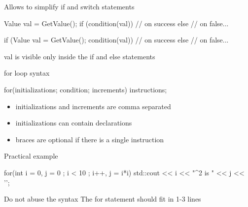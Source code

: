 \begin{frame}[fragile]
  Allows to simplify if and switch statements
  \begin{alertblock}{}
    \begin{cppcode*}{}
      Value val = GetValue();
      if (condition(val)) {
        // on success
      } else {
        // on false...
      }
    \end{cppcode*}
  \end{alertblock}
  \begin{exampleblock}{}
    \begin{cppcode*}{}
      if (Value val = GetValue(); condition(val)) {
        // on success
      } else {
        // on false...
      }
    \end{cppcode*}
    \vspace{-.1cm}
    val is visible only inside the if and else statements
  \end{exampleblock}
\end{frame}

\begin{frame}[fragile]
  \begin{block}{for loop syntax}
    \begin{cppcode*}{}
      for(initializations; condition; increments) {
        instructions;
      }
    \end{cppcode*}
    \vspace{-0.2cm}
    \begin{itemize}
      \item initializations and increments are comma separated
      \item initializations can contain declarations
      \item braces are optional if there is a single instruction
    \end{itemize}
  \end{block}
  \pause
  \begin{exampleblock}{Practical example}
    \begin{cppcode*}{}
      for(int i = 0, j = 0 ; i < 10 ; i++, j = i*i) {
        std::cout << i << "^2 is " << j << '\n';
      }
    \end{cppcode*}
  \end{exampleblock}
  \pause
  \begin{alertblock}{Do not abuse the syntax}
    The for statement should fit in 1-3 lines
  \end{alertblock}
\end{frame}

